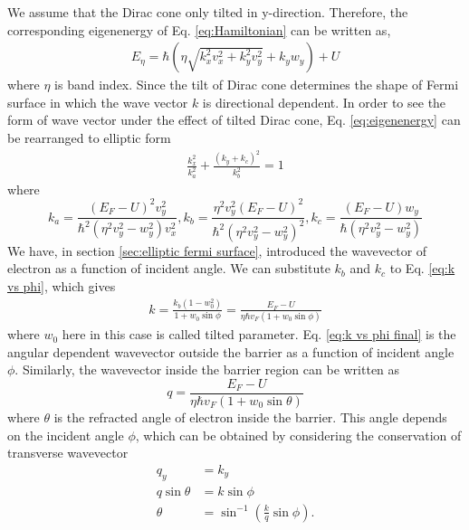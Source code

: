     We assume that the Dirac cone only tilted in y-direction. Therefore, the corresponding eigenenergy of Eq. \ref{eq:Hamiltonian} can be written as,
    \begin{align} \label{eq:eigenenergy}
        E_\eta=\hbar (\eta \sqrt{k_x^2 v_x^2+k_y^2 v_y^2 }+k_y w_y)+U
    \end{align}
    where $\eta$ is band index. Since the tilt of Dirac cone determines the shape of Fermi surface in which the wave vector $k$ is directional dependent. 
    In order to see the form of wave vector under the effect of tilted Dirac cone, Eq. \ref{eq:eigenenergy} can be rearranged to elliptic form
    \begin{align}
        \frac{k_x^2}{k_a^2} + \frac{(k_y+k_c)^2}{k_b^2} = 1
    \end{align}
    where
    $$
    k_a = \frac{(E_F-U)^2 v_y^2}{\hbar^2 (\eta^2 v_y^2 - w_y^2) v_x^2}, k_b = \frac{\eta^2 v_y^2 (E_F-U)^2}{\hbar^2 (\eta^2 v_y^2 - w_y^2)^2},
    k_c = \frac{(E_F - U)w_y}{\hbar (\eta^2 v_y^2 - w_y^2)}
    $$
    We have, in section \ref{sec:elliptic fermi surface}, introduced the wavevector of electron as a function of incident angle.
    We can substitute $k_b$ and $k_c$ to Eq. \ref{eq:k vs phi}, which gives
    \begin{align} \label{eq:k vs phi final}
        k = \frac{k_b(1-w_0^2)}{1+w_0 \sin{\phi}} = \frac{E_F - U}{\eta \hbar v_F (1+w_0 \sin{\phi})}
    \end{align}
    where $w_0$ here in this case is called tilted parameter. 
    Eq. \ref{eq:k vs phi final} is the angular dependent wavevector outside the barrier as a function of incident angle $\phi$.
    Similarly, the wavevector inside the barrier region can be written as
    \begin{equation} \label{eq:q vs theta}
        q = \frac{E_F - U}{\eta \hbar v_F (1+w_0 \sin{\theta})}
    \end{equation}
    where $\theta$ is the refracted angle of electron inside the barrier. 
    This angle depends on the incident angle $\phi$, which can be obtained by considering the conservation of transverse wavevector
    \begin{equation} \label{eq:theta}
        \begin{aligned}
            q_y&=k_y\\
            q\sin{\theta} &= k \sin{\phi}\\
            \theta &= \sin^{-1}\left(\frac{k}{q}{\sin{\phi}}\right).\\
        \end{aligned}
    \end{equation}
